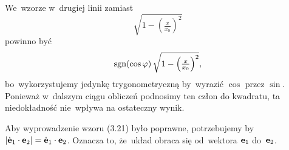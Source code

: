 \documentclass[a4paper,11pt]{article}
\numberwithin{equation}{section}
\begin{document}
\vspace{\spaceTwo}













\newpage


\vspace{0em}



\vspace{0em}


\noindent
{} We~wzorze w~drugiej linii zamiast
\begin{equation}
  \label{eq:Skalmierski-MechanikaZWytrzymalosciaETC-01}
  \sqrt{ 1 - \left( \tfrac{ x }{ x_{ 0 } } \right)^{ 2 } }
\end{equation}
powinno być
\begin{equation}
  \label{eq:SkalmierskiMechanikaZWytrzymaloscia-02}
  \textrm{sgn}( \cos \varphi ) \,
  \sqrt{ 1 - \left( \tfrac{ x }{ x_{ 0 } } \right)^{ 2 } },
\end{equation}
bo~wykorzystujemy jedynkę trygonometryczną by~wyrazić $\cos$ przez
$\sin$. Ponieważ w~dalszym ciągu obliczeń podnosimy ten człon do
kwadratu, ta niedokładność nie~wpływa na ostateczny wynik.

\vspace{\spaceFour}





\noindent
{} Aby wyprowadzenie wzoru (3.21) było poprawne,
potrzebujemy by
$| \dot{ \mathbf{e} }_{ 1 } \cdot \mathbf{e}_{ 2 } | = \dot{ \mathbf{e} }_{ 1 }
\cdot \mathbf{e}_{ 2 }$. Oznacza to, że~układ obraca się od~wektora
$\mathbf{e}_{ 1 }$ do~$\mathbf{e}_{ 2 }$.





\newpage

\end{document}
